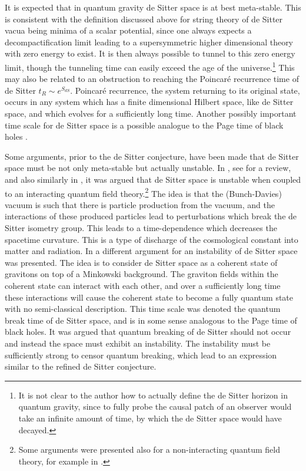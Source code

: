\documentclass[11pt,a4paper]{article}
\numberwithin{equation}{section}
\numberwithin{table}{section}\setlength{\multlinegap}{25pt}
\begin{document}
{It is expected that in quantum gravity de Sitter space is at best meta-stable. This is consistent with the definition discussed above for string theory of de Sitter vacua being minima of a scalar potential, since one always expects a decompactification limit leading to a supersymmetric higher dimensional theory with zero energy to exist. It is then always possible to tunnel to this zero energy limit, though the tunneling time can easily exceed the age of the universe.\footnote{It is not clear to the author how to actually define the de Sitter horizon in quantum gravity, since to fully probe the causal patch of an observer would take an infinite amount of time, by which the de Sitter space would have decayed.} This may also be related to an obstruction to reaching the Poincar\'e recurrence time of de Sitter $t_R \sim e^{S_{dS}}$. Poincar\'e recurrence, the system returning to its original state, occurs in any system which has a finite dimensional Hilbert space, like de Sitter space, and which evolves for a sufficiently long time. Another possibly important time scale for de Sitter space is a possible analogue to the Page time of black holes \cite{Page:1993wv,Page:1993df}.

Some arguments, prior to the de Sitter conjecture, have been made that de Sitter space must be not only meta-stable but actually unstable. In \cite{PhysRevD.31.754}, see \cite{Antoniadis_2007} for a review, and also similarly in \cite{Polyakov:2007mm,Polyakov:2009nq,Polyakov:2012uc}, it was argued that de Sitter space is unstable when coupled to an interacting quantum field theory.\footnote{Some arguments were presented also for a non-interacting quantum field theory, for example in \cite{Mottola:1985qt,Padmanabhan:2002ji,Markkanen:2017abw}.} The idea is that the (Bunch-Davies) vacuum is such that there is particle production from the vacuum, and the interactions of these produced particles lead to perturbations which break the de Sitter isometry group. This leads to a time-dependence which decreases the spacetime curvature. This is a type of discharge of the cosmological constant into matter and radiation. In \cite{Dvali:2014gua,Dvali:2017eba,Dvali:2018jhn} a different argument for an instability of de Sitter space was presented. The idea is to consider de Sitter space as a coherent state of gravitons on top of a Minkowski background. The graviton fields within the coherent state can interact with each other, and over a sufficiently long time these interactions will cause the coherent state to become a fully quantum state with no semi-classical description. This time scale was denoted the quantum break time of de Sitter space, and is in some sense analogous to the Page time of black holes. It was argued that quantum breaking of de Sitter should not occur and instead the space must exhibit an instability. The instability must be sufficiently strong to censor quantum breaking, which lead to an expression similar to the refined de Sitter conjecture.

}
\end{document}
